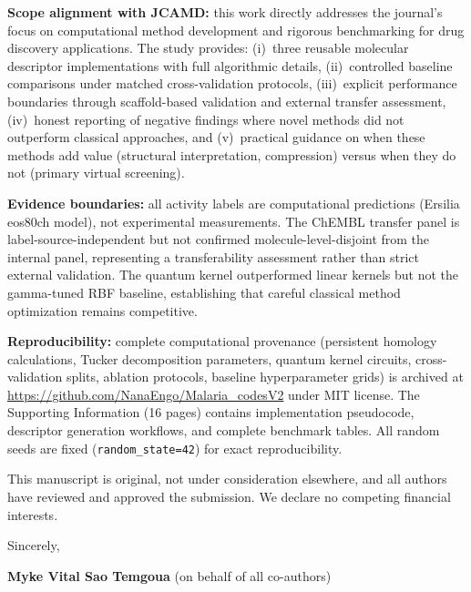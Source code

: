 \documentclass[9pt,a4paper]{article}
\begin{document}
\noindent\textbf{Scope alignment with JCAMD:} this work directly addresses the journal's focus on computational method development and rigorous benchmarking for drug discovery applications. The study provides: (i)~three reusable molecular descriptor implementations with full algorithmic details, (ii)~controlled baseline comparisons under matched cross-validation protocols, (iii)~explicit performance boundaries through scaffold-based validation and external transfer assessment, (iv)~honest reporting of negative findings where novel methods did not outperform classical approaches, and (v)~practical guidance on when these methods add value (structural interpretation, compression) versus when they do not (primary virtual screening).

\noindent\textbf{Evidence boundaries:} all activity labels are computational predictions (Ersilia eos80ch model), not experimental measurements. The ChEMBL transfer panel is label-source-independent but not confirmed molecule-level-disjoint from the internal panel, representing a transferability assessment rather than strict external validation. The quantum kernel outperformed linear kernels but not the gamma-tuned RBF baseline, establishing that careful classical method optimization remains competitive.

\noindent\textbf{Reproducibility:} complete computational provenance (persistent homology calculations, Tucker decomposition parameters, quantum kernel circuits, cross-validation splits, ablation protocols, baseline hyperparameter grids) is archived at \url{https://github.com/NanaEngo/Malaria_codesV2} under MIT license. The Supporting Information (\num{16} pages) contains implementation pseudocode, descriptor generation workflows, and complete benchmark tables. All random seeds are fixed (\texttt{random\_state=42}) for exact reproducibility.

This manuscript is original, not under consideration elsewhere, and all authors have reviewed and approved the submission. We declare no competing financial interests.

\vspace{0.3em}

\noindent Sincerely,

\noindent \textbf{Myke Vital Sao Temgoua} (on behalf of all co-authors)
\end{document}
